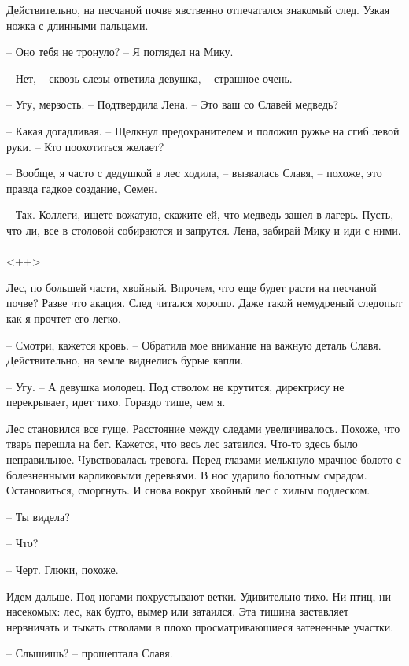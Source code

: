 \documentclass[a4paper]{book}
\begin{document}
Действительно, на песчаной почве явственно отпечатался знакомый след. Узкая ножка с длинными пальцами. 

-- Оно тебя не тронуло? -- Я поглядел на Мику.

-- Нет, -- сквозь слезы ответила девушка, -- страшное очень.

-- Угу, мерзость. -- Подтвердила Лена. -- Это ваш со Славей медведь?

-- Какая догадливая. -- Щелкнул предохранителем и положил ружье на сгиб левой руки.  -- Кто поохотиться желает?

-- Вообще, я часто с дедушкой в лес ходила, -- вызвалась Славя, -- похоже, это правда гадкое создание, Семен. 

-- Так. Коллеги, ищете вожатую, скажите ей, что медведь зашел в лагерь. Пусть, что ли, все в столовой собираются и запрутся. Лена, забирай Мику и иди с ними. 

\paragraph{}<++>


Лес, по большей части, хвойный. Впрочем, что еще будет расти на песчаной почве? Разве что акация. След читался хорошо. Даже такой немудреный следопыт как я прочтет его легко. 

-- Смотри, кажется кровь. -- Обратила мое внимание на важную деталь Славя. Действительно, на земле виднелись бурые капли. 

-- Угу. -- А девушка молодец. Под стволом не крутится, директрису не перекрывает, идет тихо. Гораздо тише, чем я.

Лес становился все гуще. Расстояние между следами увеличивалось. Похоже, что тварь перешла на бег. Кажется, что весь лес затаился. Что-то здесь было неправильное. Чувствовалась тревога. Перед глазами мелькнуло мрачное болото с болезненными карликовыми деревьями. В нос ударило болотным смрадом. Остановиться, сморгнуть. И снова вокруг хвойный лес с хилым подлеском.

-- Ты видела? 

-- Что?

-- Черт. Глюки, похоже.

Идем дальше. Под ногами похрустывают ветки. Удивительно тихо. Ни птиц, ни насекомых: лес, как будто, вымер или затаился. Эта тишина заставляет нервничать и тыкать стволами  в плохо просматривающиеся затененные участки. 

-- Слышишь? -- прошептала Славя.
\end{document}
